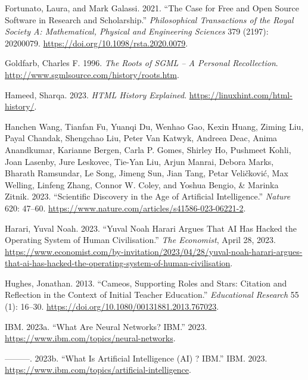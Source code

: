 \documentclass[
  letterpaper,
]{scrbook}
\newlength{\cslhangindent}
\newlength{\cslentryspacingunit} %
\newenvironment{CSLReferences}[2] %
 {%
  \setlength{\parindent}{0pt}
  \ifodd #1
  \let\oldpar\par
  \def\par{\hangindent=\cslhangindent\oldpar}
  \fi
  \setlength{\parskip}{#2\cslentryspacingunit}
 }%
 {}
\begin{document}
\begin{CSLReferences}{1}{0}
\leavevmode{}%
Fortunato, Laura, and Mark Galassi. 2021. {``The Case for Free and Open
Source Software in Research and Scholarship.''} \emph{Philosophical
Transactions of the Royal Society A: Mathematical, Physical and
Engineering Sciences} 379 (2197): 20200079.
\url{https://doi.org/10.1098/rsta.2020.0079}.

\leavevmode{}%
Goldfarb, Charles F. 1996. \emph{The {Roots} of {SGML} -- {A Personal
Recollection}}. \url{http://www.sgmlsource.com/history/roots.htm}.

\leavevmode{}%
Hameed, Sharqa. 2023. \emph{{HTML History} \textbar{} {Explained}}.
\url{https://linuxhint.com/html-history/}.

\leavevmode{}%
Hanchen Wang, Tianfan Fu, Yuanqi Du, Wenhao Gao, Kexin Huang, Ziming
Liu, Payal Chandak, Shengchao Liu, Peter Van Katwyk, Andreea Deac, Anima
Anandkumar, Karianne Bergen, Carla P. Gomes, Shirley Ho, Pushmeet Kohli,
Joan Lasenby, Jure Leskovec, Tie-Yan Liu, Arjun Manrai, Debora Marks,
Bharath Ramsundar, Le Song, Jimeng Sun, Jian Tang, Petar Veličković, Max
Welling, Linfeng Zhang, Connor W. Coley, and Yoshua Bengio, \& Marinka
Zitnik. 2023. {``Scientific Discovery in the Age of Artificial
Intelligence.''} \emph{Nature} 620: 47--60.
\url{https://www.nature.com/articles/s41586-023-06221-2}.

\leavevmode{}%
Harari, Yuval Noah. 2023. {``Yuval {Noah Harari} Argues That {AI} Has
Hacked the Operating System of Human Civilisation.''} \emph{The
Economist}, April 28, 2023.
\url{https://www.economist.com/by-invitation/2023/04/28/yuval-noah-harari-argues-that-ai-has-hacked-the-operating-system-of-human-civilisation}.

\leavevmode{}%
Hughes, Jonathan. 2013. {``Cameos, Supporting Roles and Stars: Citation
and Reflection in the Context of Initial Teacher Education.''}
\emph{Educational Research} 55 (1): 16--30.
\url{https://doi.org/10.1080/00131881.2013.767023}.

\leavevmode{}%
IBM. 2023a. {``What Are {Neural Networks}? \textbar{} {IBM}.''} 2023.
\url{https://www.ibm.com/topics/neural-networks}.

\leavevmode{}%
---------. 2023b. {``What Is {Artificial Intelligence} ({AI}) ?
\textbar{} {IBM}.''} {IBM}. 2023.
\url{https://www.ibm.com/topics/artificial-intelligence}.


\end{CSLReferences}
\end{document}
